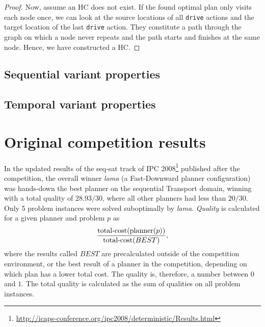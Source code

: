 \begin{proof}
Now, assume an HC does not exist. If the found optimal plan only visits each node once,
we can look at the source locations of all \verb+drive+ actions and the target
location of the last \verb+drive+ action. They constitute a path through the graph on which a node never repeats and the path starts and finishes at the same node.
Hence, we have constructed a HC.
\end{proof}

\subsection{Sequential variant properties}



\subsection{Temporal variant properties}

















\section{Original competition results}


In the updated results of the seq-sat track of IPC 2008\footnote{\url{http://icaps-conference.org/ipc2008/deterministic/Results.html}} published after the competition,
the overall winner \textit{lama} (a Fast-Downward  planner configuration)
was hands-down the best planner on the sequential Transport domain, winning
with a total quality of $28.93/30$, where all other planners had less than $20/30$.
Only 5 problem instances were solved suboptimally by \textit{lama}.
\textit{Quality} is calculated for a given planner and problem $p$
as $$\frac{\textrm{total-cost}(\textrm{planner}(p))}{\textrm{total-cost}(BEST)},$$ where the results called $BEST$
are precalculated outside of the competition environment, or the best result of a planner in the competition, depending on which plan has a lower total cost. The quality is, therefore, a number between $0$ and $1$. The total quality is calculated as the sum of qualities on all problem instances.

